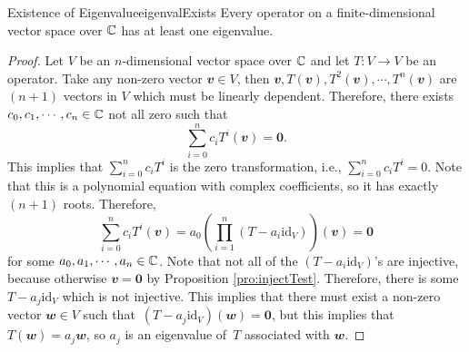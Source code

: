 \documentclass[math]{amznotes}
\theoremstyle{remark}
\newcommand{\zero}{\mathbf{0}}
\begin{document}
\begin{probox}{Existence of Eigenvalue}{eigenvalExists}
    Every operator on a finite-dimensional vector space over $\mathbb{C}$ has at least one eigenvalue.
    \tcblower
    \begin{proof}
        Let $V$ be an $n$-dimensional vector space over $\mathbb{C}$ and let $T \colon V \to V$ be an operator. Take any non-zero vector $\mathbfit{v} \in V$, then $\mathbfit{v}, T(\mathbfit{v}), T^2(\mathbfit{v}), \cdots, T^n(\mathbfit{v})$ are $(n + 1)$ vectors in $V$ which must be linearly dependent. Therefore, there exists $c_0, c_1, \cdots, c_n \in \mathbb{C}$ not all zero such that 
        \begin{equation*}
            \sum_{i = 0}^{n}c_iT^i(\mathbfit{v}) = \zero.
        \end{equation*}
        This implies that $\sum_{i = 0}^{n}c_iT^i$ is the zero transformation, i.e., $\sum_{i = 0}^{n}c_iT^i = 0$. Note that this is a polynomial equation with complex coefficients, so it has exactly $(n + 1)$ roots. Therefore, 
        \begin{equation*}
            \sum_{i = 0}^{n}c_iT^i(\mathbfit{v}) = a_0\left(\prod_{i = 1}^{n}(T - a_i\mathrm{id}_V)\right)(\mathbfit{v}) = \zero
        \end{equation*}
        for some $a_0, a_1, \cdots, a_n \in \mathbb{C}$. Note that not all of the $(T - a_i\mathrm{id}_V)$'s are injective, because otherwise $\mathbfit{v} = \zero$ by Proposition \ref{pro:injectTest}. Therefore, there is some $T - a_j\mathrm{id}_V$ which is not injective. This implies that there must exist a non-zero vector $\mathbfit{w} \in V$ such that~$(T - a_j\mathrm{id}_V)(\mathbfit{w}) = \zero$, but this implies that $T(\mathbfit{w}) = a_j\mathbfit{w}$, so $a_j$ is an eigenvalue of~$T$ associated with $\mathbfit{w}$.
    \end{proof}
\end{probox}
\end{document}
